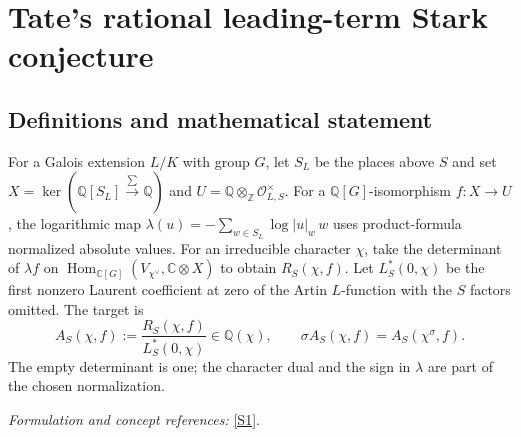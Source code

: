 \documentclass[11pt,a4paper]{article}
\newcommand{\Z}{\mathbb{Z}}
\newcommand{\Q}{\mathbb{Q}}
\newcommand{\C}{\mathbb{C}}
\newcommand{\sref}[2]{\hyperlink{source:#1:#2}{[S#2]}}
\newif\ifshowcatalogue
\newcommand{\cataloguescope}[1]{\ifshowcatalogue
 \paragraph{Exact scope in the supplied catalogue.}
 \begin{quote}\small #1\end{quote}\fi}
\numberwithin{equation}{section}
\begin{document}
\setcounter{section}{165}
\clearpage
\section{\texorpdfstring{Tate's rational leading-term Stark conjecture}{Tate's rational leading-term Stark conjecture}}\label{166}
\subsection{Definitions and mathematical statement}
For a Galois extension $L/K$ with group $G$, let $S_L$ be the places above $S$ and set
$X=\ker(\Q[S_L]\xrightarrow{\sum}\Q)$ and
$U=\Q\otimes_{\Z}\mathcal O_{L,S}^{\times}$. For a $\Q[G]$-isomorphism $f:X\to U$, the logarithmic map
$\lambda(u)=-\sum_{w\in S_L}\log|u|_w\,w$
uses product-formula normalized absolute values. For an irreducible character $\chi$, take the determinant of $\lambda f$ on
$\operatorname{Hom}_{\C[G]}(V_{\chi^\vee},\C\otimes X)$ to obtain $R_S(\chi,f)$. Let $L_S^*(0,\chi)$ be the first nonzero Laurent coefficient at zero of the Artin $L$-function with the $S$ factors omitted. The target is
\[
 A_S(\chi,f):=\frac{R_S(\chi,f)}{L_S^*(0,\chi)}\in\Q(\chi),
 \qquad\sigma A_S(\chi,f)=A_S(\chi^\sigma,f).
\]
The empty determinant is one; the character dual and the sign in $\lambda$ are part of the chosen normalization.
\par\smallskip\textit{Formulation and concept references:} \sref{166}{1}.
\cataloguescope{For every finite Galois extension L/K of number fields with group G, let S be any finite set of places of K containing the archimedean and ramified places. Let X be the augmentation kernel of the free Q-module on places of L above S, U=Q tensor\_Z O\_(L,S)\textasciicircum{}*, and f:X->U any Q[G]-isomorphism. Define lambda:R tensor U->R tensor X by lambda(u)=-sum\_w log|u|\_w w, using product-formula normalized absolute values. For each irreducible complex character chi of G, set R\_S(chi,f)=det\_C(lambda f acting by postcomposition on Hom\_C[G](V\_(dual chi),C tensor X)) and A\_S(chi,f)=R\_S(chi,f)/L\_S\textasciicircum{}*(0,chi), where L\_S\textasciicircum{}* is the first nonzero Laurent coefficient of the S-truncated Artin L-function and an empty determinant is1. Is A\_S(chi,f) in Q(chi), with sigma(A\_S(chi,f))=A\_S(chi\textasciicircum{}sigma,f) for every sigma in Aut(C)?}
\end{document}
